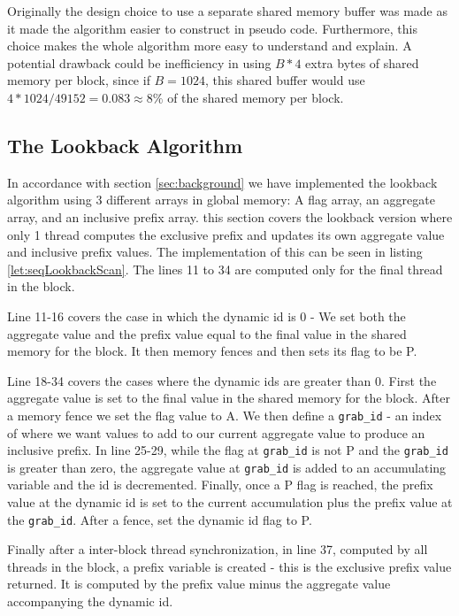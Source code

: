 \documentclass[twocolumn]{article}
\begin{document}
Originally the design choice to use a separate shared memory buffer was made as it made the algorithm easier to construct in pseudo code. Furthermore, this choice makes the whole algorithm more easy to understand and explain. A potential drawback could be inefficiency in using $B*4$ extra bytes of shared memory per block, since if $B=1024$, this shared buffer would use $4*1024/49152 = 0.083\approx 8\%$ of the shared memory per block.

\subsection{The Lookback Algorithm}
\label{sec:impl-lookback-alg}

In accordance with section \ref{sec:background} we have implemented the lookback algorithm using 3 different arrays in global memory: A flag array, an aggregate array, and an inclusive prefix array. this section covers the lookback version where only 1 thread computes the exclusive prefix and updates its own aggregate value and inclusive prefix values. The implementation of this can be seen in listing \ref{let:seqLookbackScan}. The lines 11 to 34 are computed only for the final thread in the block.

Line 11-16 covers the case in which the dynamic id is 0 - We set both the aggregate value and the prefix value equal to the final value in the shared memory for the block. It then memory fences and then sets its flag to be P.

Line 18-34 covers the cases where the dynamic ids are greater than 0. First the aggregate value is set to the final value in the shared memory for the block. After a memory fence we set the flag value to A. We then define a \verb|grab_id| - an index of where we want values to add to our current aggregate value to produce an inclusive prefix. In line 25-29, while the flag at \verb|grab_id| is not P and the \verb|grab_id| is greater than zero, the aggregate value at \verb|grab_id| is added to an accumulating variable and the id is decremented. Finally, once a P flag is reached, the prefix value at the dynamic id is set to the current accumulation plus the prefix value at the \verb|grab_id|. After a fence, set the dynamic id flag to P.

Finally after a inter-block thread synchronization, in line 37, computed by all threads in the block, a prefix variable is created - this is the exclusive prefix value returned. It is computed by the prefix value minus the aggregate value accompanying the dynamic id.
\end{document}
